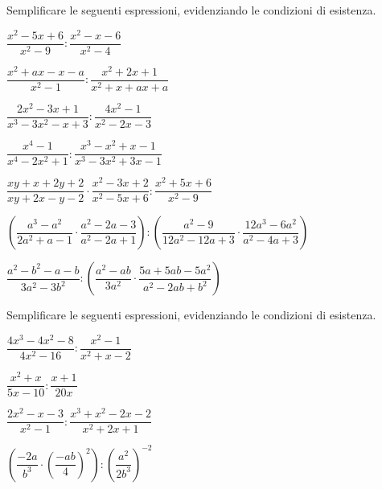 \begin{esercizio}[*]
\label{ese:19.19}
Semplificare le seguenti espressioni, evidenziando le condizioni di esistenza.
\begin{enumeratea}
\item \(\dfrac{x^{2}-5x+6}{x^{2}-9}:\dfrac{x^{2}-x-6}{x^{2}-4}\)
\item \(\dfrac{x^{2}+ax-x-a}{x^{2}-1}:\dfrac{x^{2}+2x+1}{x^{2}+x+ax+a}\)
\item \(\dfrac{2x^{2}-3x+1}{x^{3}-3x^{2}-x+3}:\dfrac{4x^{2}-1}{x^{2}-2x-3}\)
\item \(\dfrac{x^{4}-1}{x^{4}-2x^{2}+1}:
\dfrac{x^{3}-x^{2}+x-1}{x^{3}-3x^{2}+3x-1}\)
\item \(\dfrac{xy+x+2y+2}{xy+2x-y-2}\cdot
\dfrac{x^{2}-3x+2}{x^{2}-5x+6}:\dfrac{x^{2}+5x+6}{x^{2}-9}\)
\item \(\left(\dfrac{a^{3}-a^{2}}{2a^{2}+a-1}\cdot
\dfrac{a^{2}-2a-3}{a^{2}-2a+1}\right):
\left(\dfrac{a^{2}-9}{12a^{2}-12a+3}\cdot
\dfrac{12a^{3}-6a^{2}}{a^{2}-4a+3}\right)\)
\item \(\dfrac{a^{2}-b^{2}-a-b}{3a^{2}-3b^{2}}:
\left(\dfrac{a^{2}-ab}{3a^{2}}\cdot
\dfrac{5a+5ab-5a^{2}}{a^{2}-2ab+b^{2}}\right)\)
\end{enumeratea}
\end{esercizio}


\begin{esercizio}
\label{ese:19.21}
Semplificare le seguenti espressioni, evidenziando le condizioni di esistenza.
\begin{htmulticols}{2}
\begin{enumeratea}
\item \(\dfrac{4x^{3}-4x^{2}-8}{4x^{2}-16}:\dfrac{x^{2}-1}{x^{2}+x-2}\)
\item \(\dfrac{x^{2}+x}{5x-10}:\dfrac{x+1}{20x}\)
\item \(\dfrac{2x^{2}-x-3}{x^{2}-1}:\dfrac{x^{3}+x^{2}-2x-2}{x^{2}+2x+1}\)
\item \(\left(\dfrac{-{2a}}{b^{3}}\cdot
\left(\dfrac{-{ab}}{4}\right)^{2}\right):
\left(\dfrac{a^{2}}{2b^{3}}\right)^{-2}\)%
\end{enumeratea}
\end{htmulticols}
\end{esercizio}

